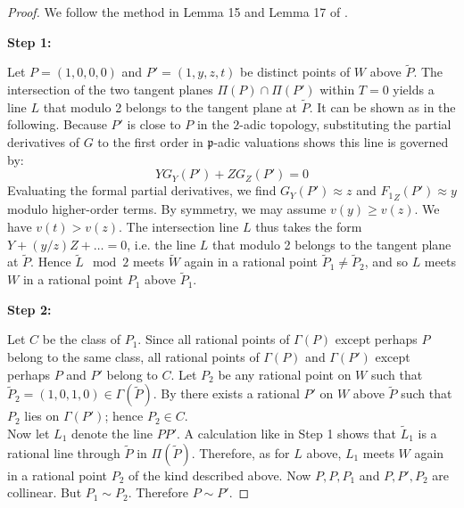 \documentclass[11pt]{article}
\theoremstyle{definition}
\begin{document}
\begin{proof}
We follow the method in Lemma 15 and Lemma 17 of \cite{swinnertondyer}.

\vspace{0.5em}
\noindent\textbf{Step 1:}

Let $P = (1, 0, 0, 0)$ and $P'= (1, y, z, t)$ be distinct points of $W$  above $\tilde{P}$.
The intersection of the two tangent planes $\Pi(P) \cap \Pi(P')$ within $T=0$ yields a line $L$ that modulo 2 belongs to the tangent plane at  $\tilde{P}$. It can be shown as in the following. Because $P'$ is close to $P$ in the $2$-adic topology, substituting the partial derivatives of $G$ to the first order in $\mathfrak{p}$-adic valuations shows this line is governed by:
\begin{equation}
Y G_Y(P') + Z G_Z(P') = 0
\end{equation}
Evaluating the formal partial derivatives, we find $G_Y(P') \approx z$ and ${F_1}_Z(P') \approx y$ modulo higher-order terms. By symmetry, we may assume $v(y) \ge v(z)$. We have $v(t) > v(z)$. The intersection line $L$ thus takes the form $Y + (y/z)Z + \dots = 0$, i.e.  the line $L$ that modulo 2 belongs to the tangent plane at  $\tilde{P}$. Hence $\tilde L \mod 2$ meets $\tilde W$ again in a rational point $\tilde P_1 \neq \tilde P_2$, and so $L$ meets $W$ in a rational point $P_1$ above $\tilde P_1$.

\vspace{0.5em}
\noindent\textbf{Step 2:}

Let $C$ be the class of $P_1$. Since all rational points of $\Gamma(P)$ except perhaps $P$ belong to the same class, all rational points of $\Gamma(P)$ and $\Gamma(P')$ except perhaps $P$ and $P'$ belong to $C$. Let $P_2 $ be any rational point on $W$ such that $\tilde P_2 = (1,0,1,0) \in \Gamma (\tilde P)$. By  there exists a rational $P'$  on $W$ above $\tilde P$ such that $P_2$ lies on $\Gamma(P')$; hence $P_2 \in C$.\\
Now let $L_1$ denote the line $PP'$. A calculation like in Step 1 shows that $\tilde L_1$ is a rational line through $\tilde P$ in $\Pi(\tilde P)$. Therefore, as for $L$ above, $L_1$ meets $W$ again in a rational point $P_2$ of the kind described above. Now $P, P, P_1$ and $P, P', P_2$ are collinear. But $P_1 \sim P_2$. Therefore $P \sim P'$.
\end{proof}
\end{document}

